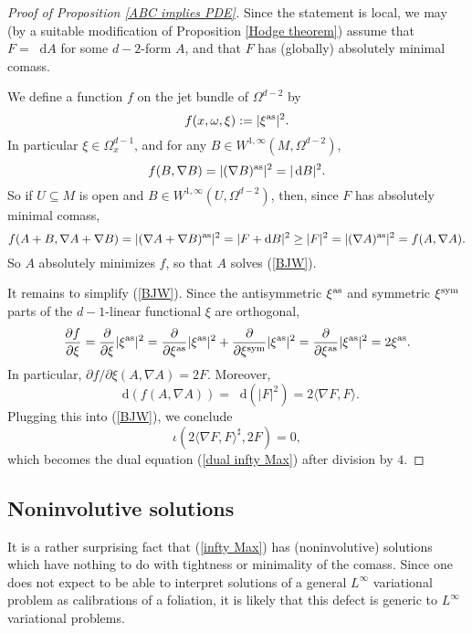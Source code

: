 \documentclass[reqno,11pt]{amsart}
\newcommand*\dif{\mathop{}\!\mathrm{d}}
\theoremstyle{definition}
\numberwithin{equation}{section}
\begin{document}
\begin{proof}[Proof of Proposition \ref{ABC implies PDE}]
Since the statement is local, we may (by a suitable modification of Proposition \ref{Hodge theorem}) assume that $F = \dif A$ for some $d - 2$-form $A$, and that $F$ has (globally) absolutely minimal comass.

We define a function $f$ on the jet bundle of $\Omega^{d - 2}$ by 
$$f(x, \omega, \xi) := |\xi^{\rm as}|^2.$$
In particular $\xi \in \Omega^{d - 1}_x$, and for any $B \in W^{1, \infty}(M, \Omega^{d - 2})$,
$$f(B, \nabla B) = |(\nabla B)^{\rm as}|^2 = |\dif B|^2.$$
So if $U \subseteq M$ is open and $B \in W^{1, \infty}(U, \Omega^{d - 2})$, then, since $F$ has absolutely minimal comass,
$$f(A + B, \nabla A + \nabla B) = |(\nabla A + \nabla B)^{\rm as}|^2 = |F + \dif B|^2 \geq |F|^2 = |(\nabla A)^{\rm as}|^2 = f(A, \nabla A).$$
So $A$ absolutely minimizes $f$, so that $A$ solves (\ref{BJW}).

It remains to simplify (\ref{BJW}).
Since the antisymmetric $\xi^{\rm as}$ and symmetric $\xi^{\rm sym}$ parts of the $d - 1$-linear functional $\xi$ are orthogonal,
$$\frac{\partial f}{\partial \xi} = \frac{\partial}{\partial \xi} |\xi^{\rm as}|^2 = \frac{\partial}{\partial \xi^{\rm as}} |\xi^{\rm as}|^2 + \frac{\partial}{\partial \xi^{\rm sym}} |\xi^{\rm as}|^2 = \frac{\partial}{\partial \xi^{\rm as}} |\xi^{\rm as}|^2 = 2\xi^{\rm as}.$$
In particular, $\partial f/\partial \xi(A, \nabla A) = 2F$.
Moreover, 
$$\dif(f(A, \nabla A)) = \dif(|F|^2) = 2\langle \nabla F, F\rangle.$$
Plugging this into (\ref{BJW}), we conclude 
$$\iota(2\langle \nabla F, F\rangle^\sharp, 2F) = 0,$$
which becomes the dual equation (\ref{dual infty Max}) after division by $4$.
\end{proof}

\subsection{Noninvolutive solutions}
It is a rather surprising fact that (\ref{infty Max}) has (noninvolutive) solutions which have nothing to do with tightness or minimality of the comass.
Since one does not expect to be able to interpret solutions of a general $L^\infty$ variational problem as calibrations of a foliation, it is likely that this defect is generic to $L^\infty$ variational problems.
\end{document}
